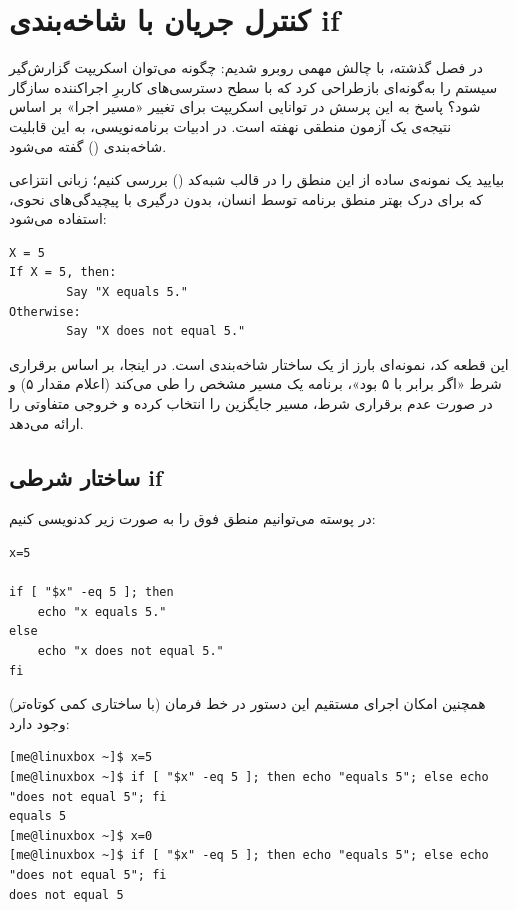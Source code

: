 \chapter{کنترل جریان با شاخه‌بندی if}

در فصل گذشته، با چالش مهمی روبرو شدیم: چگونه می‌توان اسکریپت گزارش‌گیر سیستم را به‌گونه‌ای بازطراحی کرد که با سطح دسترسی‌های کاربرِ اجراکننده سازگار شود؟ پاسخ به این پرسش در توانایی اسکریپت برای تغییر «مسیر اجرا» بر اساس نتیجه‌ی یک آزمون منطقی نهفته است. در ادبیات برنامه‌نویسی، به این قابلیت شاخه‌بندی () گفته می‌شود.

بیایید یک نمونه‌ی ساده از این منطق را در قالب شبه‌کد () بررسی کنیم؛ زبانی انتزاعی که برای درک بهتر منطق برنامه توسط انسان، بدون درگیری با پیچیدگی‌های نحوی، استفاده می‌شود:

\begin{latin}
\begin{lstlisting}
X = 5
If X = 5, then:
        Say "X equals 5."
Otherwise:
        Say "X does not equal 5."
\end{lstlisting}
\end{latin}

این قطعه کد، نمونه‌ای بارز از یک ساختار شاخه‌بندی است. در اینجا، بر اساس برقراری شرط «اگر  برابر با ۵ بود»، برنامه یک مسیر مشخص را طی می‌کند (اعلام مقدار ۵) و در صورت عدم برقراری شرط، مسیر جایگزین را انتخاب کرده و خروجی متفاوتی را ارائه می‌دهد.

\section{ساختار شرطی if}

در پوسته می‌توانیم منطق فوق را به صورت زیر کدنویسی کنیم:

\begin{latin}
\begin{lstlisting}
x=5

if [ "$x" -eq 5 ]; then
    echo "x equals 5."
else
    echo "x does not equal 5."
fi
\end{lstlisting}
\end{latin}

همچنین امکان اجرای مستقیم این دستور در خط فرمان (با ساختاری کمی کوتاه‌تر) وجود دارد:

\begin{latin}
\begin{lstlisting}
[me@linuxbox ~]$ x=5
[me@linuxbox ~]$ if [ "$x" -eq 5 ]; then echo "equals 5"; else echo "does not equal 5"; fi
equals 5
[me@linuxbox ~]$ x=0
[me@linuxbox ~]$ if [ "$x" -eq 5 ]; then echo "equals 5"; else echo "does not equal 5"; fi
does not equal 5
\end{lstlisting}
\end{latin}

